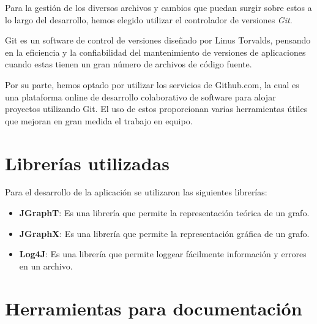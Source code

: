 \documentclass{book}
\begin{document}
Para la gestión de los diversos archivos y cambios que puedan surgir sobre estos a lo largo del desarrollo, hemos elegido utilizar el controlador de versiones \textit{Git}. 
\par
Git es un software de control de versiones diseñado por Linus Torvalds, pensando en la eficiencia y la confiabilidad del mantenimiento de versiones de aplicaciones cuando estas tienen un gran número de archivos de código fuente.
\par
Por su parte, hemos optado por utilizar los servicios de Github.com, la cual es una plataforma online de desarrollo colaborativo de software para alojar proyectos utilizando Git. El uso de estos proporcionan varias herramientas útiles que mejoran en gran medida el trabajo en equipo.
\medskip

\section{Librerías utilizadas}
Para el desarrollo de la aplicación se utilizaron las siguientes librerías:
\begin{itemize}
		\renewcommand{\labelitemi}{\scriptsize\tiny$\blacksquare$} 
		\itemsep=10pt \topsep=0pt \partopsep=0pt \parskip=0pt \parsep=10pt
		
		\item \textbf{JGraphT}: Es una librería que permite la representación teórica de un grafo.
		
		\item \textbf{JGraphX}: Es una librería que permite la representación gráfica de un grafo.

		\item \textbf{Log4J}: Es una librería que permite loggear fácilmente información y errores en un archivo. 

	\end{itemize}


\section{Herramientas para documentación}
\end{document}
